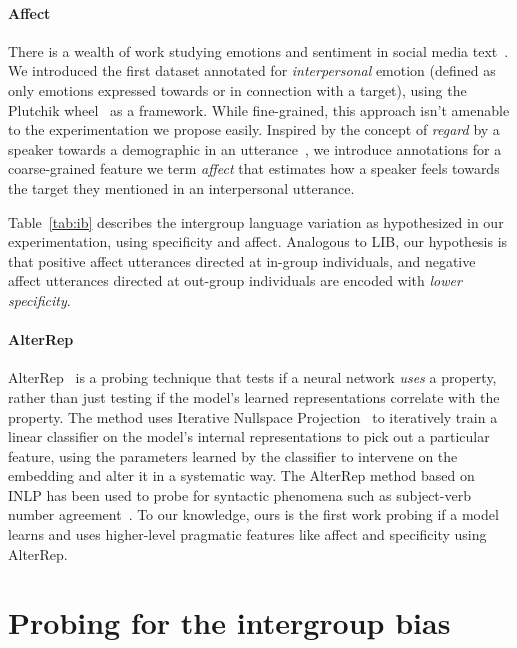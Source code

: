 

\paragraph{Affect} There is a wealth of work studying emotions and sentiment in social media text~\citep{mohammad-2012-emotional,6406313, Mohammad2015UsingHT, abdul-mageed-ungar-2017-emonet,desai-etal-2020-detecting,demszky-etal-2020-goemotions}. We introduced the first dataset annotated for \emph{interpersonal} emotion (defined as only emotions expressed towards or in connection with a target), using the Plutchik wheel~\citep{plutchik1980general, plutchik2001nature} as a framework. While fine-grained, this approach isn't amenable to the experimentation we propose easily. Inspired by the concept of \emph{regard} by a speaker towards a demographic in an utterance~\citep{sheng-etal-2019-woman}, we introduce annotations for a coarse-grained feature we term \emph{affect} that estimates how a speaker feels towards the target they mentioned in an interpersonal utterance.

Table~\ref{tab:ib} describes the intergroup language variation as hypothesized in our experimentation, using specificity and affect. Analogous to LIB, our hypothesis is that positive affect utterances directed at in-group individuals, and negative affect utterances directed at out-group individuals are encoded with \emph{lower specificity}.

\paragraph{AlterRep} AlterRep~\citep{ravfogel-etal-2021-counterfactual} is a probing technique that tests if a neural network \emph{uses} a property, rather than just testing if the model's learned representations correlate with the property. The method uses Iterative Nullspace Projection~\citep[INLP;][]{ravfogel-etal-2020-null} to iteratively train a linear classifier on the model's internal representations to pick out a particular feature, using the parameters learned by the classifier to intervene on the embedding and alter it in a systematic way. The AlterRep method based on INLP has been used to probe for syntactic phenomena such as subject-verb number agreement~\citep{ravfogel-etal-2021-counterfactual}. To our knowledge, ours is the first work probing if a model learns and uses higher-level pragmatic features like affect and specificity using AlterRep.

\section{Probing for the intergroup bias}

